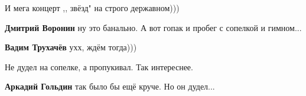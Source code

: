 \begin{itemize}
 
И мега концерт ,, звёзд" на строго державном)))

\begin{itemize}
 
\textbf{Дмитрий Воронин} ну это банально. А вот гопак и пробег с сопелкой и гимном...

 
\textbf{Вадим Трухачёв} ухх, ждём тогда)))
\end{itemize}

 
Не дудел на сопелке, а пропукивал. Так интереснее.

\begin{itemize}
 
\textbf{Аркадий Гольдин} так было бы ещё круче. Но он дудел...
\end{itemize}


\end{itemize}

